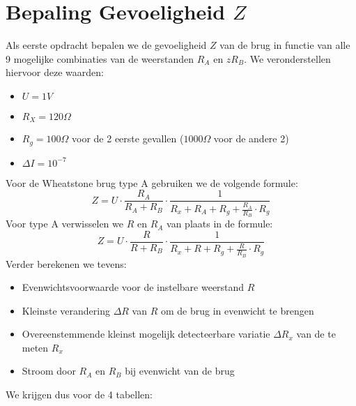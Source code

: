 \section{Bepaling Gevoeligheid $Z$}
Als eerste opdracht bepalen we de gevoeligheid $Z$ van de brug in functie van alle 9 mogelijke combinaties
van de weerstanden $R_A$ en $zR_B$. We veronderstellen hiervoor deze waarden:
\begin{itemize}
    \item $U = 1 V$
    \item $R_X = 120 \Omega$
    \item $R_g = 100 \Omega$ voor de 2 eerste gevallen ($1000 \Omega$ voor de andere 2)
    \item $\Delta I = 10^{-7}$
\end{itemize}
Voor de Wheatstone brug type A gebruiken we de volgende formule:
\begin{equation}
    Z = U \cdot \frac{R_A}{R_A + R_B} \cdot \frac{1}{R_x + R_A + R_g + \frac{R_A}{R_B}\cdot R_g}
\end{equation}
Voor type A verwisselen we $R$ en $R_A$ van plaats in de formule:
\begin{equation}
    Z = U \cdot \frac{R}{R + R_B} \cdot \frac{1}{R_x + R + R_g + \frac{R}{R_B}\cdot R_g}
\end{equation}
Verder berekenen we tevens:
\begin{itemize}
    \item Evenwichtsvoorwaarde voor de instelbare weerstand $R$
    \item Kleinste verandering $\Delta R$ van $R$ om de brug in evenwicht te brengen
    \item Overeenstemmende kleinst mogelijk detecteerbare variatie $\Delta R_x$ van de te meten $R_x$ 
    \item Stroom door $R_A$ en $R_B$ bij evenwicht van de brug
\end{itemize}
We krijgen dus voor de 4 tabellen:
